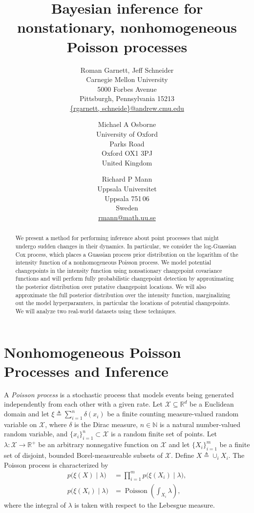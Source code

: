 \documentclass{article}
\title{Bayesian inference for nonstationary, nonhomogeneous Poisson
  processes}
\author{
  Roman Garnett, Jeff Schneider\\
  {Carnegie Mellon University}\\
  {5000 Forbes Avenue}\\
  {Pittsburgh, Pennsylvania 15213}\\
  \url{{rgarnett, schneide}@andrew.cmu.edu}
  \and
  Michael A Osborne\\
  {University of Oxford}\\
  {Parks Road}\\
  {Oxford OX1 3PJ}\\
  {United Kingdom}\\
  \and
  Richard P Mann\\
  {Uppsala Universitet}\\
  {Uppsala 751\,06}\\
  {Sweden}\\
  \url{rmann@math.uu.se}
}
\newcommand{\deq}{\triangleq}
\newcommand{\cm}[1]{\mathcal{#1}}
\newcommand{\given}{\mid}
\newcommand{\R}{\mathbb{R}}
\newcommand{\N}{\mathbb{N}}
\DeclareMathOperator{\poisson}{Poisson}
\begin{document}
\maketitle

\begin{abstract}
  We present a method for performing inference about point processes
  that might undergo sudden changes in their dynamics.  In particular,
  we consider the log-Guassian Cox process, which places a Guassian
  process prior distribution on the logarithm of the intensity
  function of a nonhomogeneous Poisson process.  We model potential
  changepoints in the intensity function using nonsationary
  changepoint covariance functions and will perform fully
  probabilistic changepoint detection by approximating the posterior
  distribution over putative changepoint locations.  We will also
  approximate the full posterior distribution over the intensity
  function, marginalizing out the model hyperparamters, in particular
  the locations of potential changepoints.  We will analyze two
  real-world datasets using these techniques.
\end{abstract}

\section{Nonhomogeneous Poisson Processes and Inference}

A \emph{Poisson process} is a stochastic process that models events
being generated independently from each other with a given rate.  Let
$\cm{X} \subseteq \R^d$ be a Euclidean domain and let $\xi \deq
\sum_{i = 1}^n \delta(x_i)$ be a finite counting measure-valued random
variable on $\cm{X}$, where $\delta$ is the Dirac measure, $n \in \N$
is a natural number-valued random variable, and $\lbrace x_i
\rbrace_{i = 1}^n \subset \cm{X}$ is a random finite set of points.
Let $\lambda\colon \cm{X} \to \R^+$ be an arbitrary nonnegative
function on $\cm{X}$ and let $\lbrace X_i \rbrace_{i = 1}^m$ be a
finite set of disjoint, bounded Borel-measureable subsets of $\cm{X}$.
Define $X \deq \cup_i X_i$.  The Poisson process is characterized by
\begin{align}
  p\bigl(\xi(X) \given \lambda \bigr) 
  &= 
  \prod_{i=1}^m p\bigl(\xi(X_i)\given \lambda \bigr),
  \nonumber
  \\
  p\bigl(\xi(X_i) \given \lambda \bigr)
  &=
  \poisson\left( \textstyle \int_{X_i} \lambda \right),
  \label{realprobability}
\end{align}
where the integral of $\lambda$ is taken with respect to the Lebesgue
measure.
\end{document}
